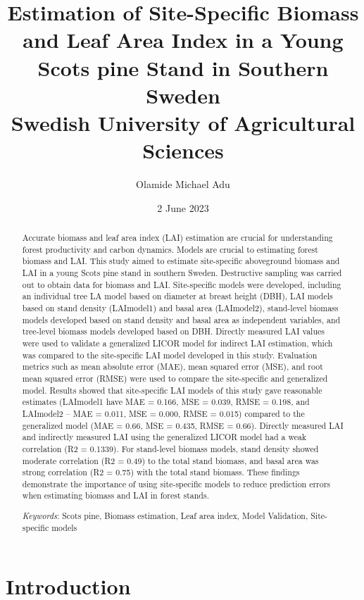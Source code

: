 \documentclass[11pt, a4paper]{report}
\title{ {Estimation of Site-Specific Biomass and Leaf Area Index in a Young Scots pine Stand in Southern Sweden}\\ {Swedish University of Agricultural Sciences}\\ }
\author{Olamide Michael Adu}
\date{2 June 2023}
\begin{document}
\maketitle
\begin{abstract}

Accurate biomass and leaf area index (LAI) estimation are crucial for understanding forest productivity and carbon dynamics. Models are crucial to estimating forest biomass and LAI. This study aimed to estimate site-specific aboveground biomass and LAI in a young Scots pine stand in southern Sweden. Destructive sampling was carried out to obtain data for biomass and LAI. Site-specific models were developed, including an individual tree LA model based on diameter at breast height (DBH), LAI models based on stand density (LAImodel1) and basal area (LAImodel2), stand-level biomass models developed based on stand density and basal area as independent variables, and tree-level biomass models developed based on DBH. Directly measured LAI values were used to validate a generalized LICOR model for indirect LAI estimation, which was compared to the site-specific LAI model developed in this study. Evaluation metrics such as mean absolute error (MAE), mean squared error (MSE), and root mean squared error (RMSE) were used to compare the site-specific and generalized model. Results showed that site-specific LAI models of this study gave reasonable estimates (LAImodel1 have MAE = 0.166, MSE = 0.039, RMSE = 0.198, and LAImodel2 – MAE = 0.011, MSE = 0.000, RMSE = 0.015) compared to the generalized model (MAE = 0.66, MSE = 0.435, RMSE = 0.66). Directly measured LAI and indirectly measured LAI using the generalized LICOR model had a weak correlation (R2 = 0.1339). For stand-level biomass models, stand density showed moderate correlation (R2 = 0.49) to the total stand biomass, and basal area was strong correlation (R2 = 0.75) with the total stand biomass. These findings demonstrate the importance of using site-specific models to reduce prediction errors when estimating biomass and LAI in forest stands.

\textit{Keywords}: Scots pine, Biomass estimation, Leaf area index, Model Validation, Site-specific models
\end{abstract}
\tableofcontents

\chapter{Introduction}
\end{document}
